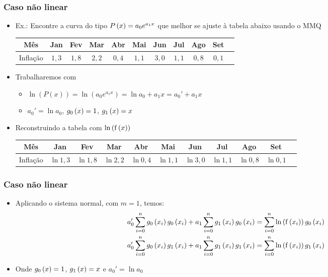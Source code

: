 \begin{frame}
\frametitle{Caso não linear}

\begin{itemize}
  \item Ex.: Encontre a curva do tipo $P\left(x\right) = a_0 e^{a_1 x}$ que melhor se ajuste à tabela abaixo usando o MMQ
\begin{tabular}{|c|c|c|c|c|c|c|c|c|c|c}
\hline
Mês & Jan & Fev & Mar & Abr & Mai & Jun & Jul & Ago & Set\\
\hline
Inflação & $1,3$ & $1,8$ & $2,2$ & $0,4$ & $1,1$ & $3,0$ & $1,1$ & $0,8$ & $0,1$\\
\hline
\end{tabular}
  \item Trabalharemos com 
    \begin{itemize}
      \item $\ln \left( P\left(x\right) \right) = \ln \left(a_0 e^{a_1 x}\right) = \ln a_0 + a_1 x = a_0' + a_1 x$
      \item $a_0' = \ln a_0$, $g_0\left(x\right) = 1$, $g_1\left(x\right) = x$
    \end{itemize}
  \item Reconstruindo a tabela com $\operatorname{\mathrm{ln}} \left( \mathrm{f} \left(x\right) \right)$
\begin{tabular}{|c|c|c|c|c|c|c|c|c|c|c}
\hline
Mês & Jan & Fev & Mar & Abr & Mai & Jun & Jul & Ago & Set\\
\hline
Inflação & $\ln 1,3$ & $\ln 1,8$ & $\ln 2,2$ & $\ln 0,4$ & $\ln 1,1$ & $\ln 3,0$ & $\ln 1,1$ & $\ln 0,8$ & $\ln 0,1$\\
\hline
\end{tabular}\end{itemize}
\end{frame}

\begin{frame}
\frametitle{Caso não linear}

\begin{itemize}
  \item Aplicando o sistema normal, com $m=1$, temos:
\begin{align*}
a_0' \sum_{i=0}^{n} \G_0\left(\x_i\right) \G_0\left(\x_i\right) + 
  a_1 \sum_{i=0}^{n} \G_1\left(\x_i\right) \G_0\left(\x_i\right) &=
  \sum_{i=0}^{n} \ln \left(\f\left(\x_i\right)\right) \G_0 \left(\x_i\right)\\
%
a_0' \sum_{i=0}^{n} \G_0\left(\x_i\right) \G_1\left(\x_i\right) + 
  a_1 \sum_{i=0}^{n} \G_1\left(\x_i\right) \G_1\left(\x_i\right) &=
  \sum_{i=0}^{n} \ln \left(\f\left(\x_i\right)\right) \G_1 \left(\x_i\right)
\end{align*}
  \item Onde $g_0 \left(x\right) = 1$, $g_1 \left(x\right) = x$ e $a_0' = \ln a_0$
\end{itemize}
\end{frame}

